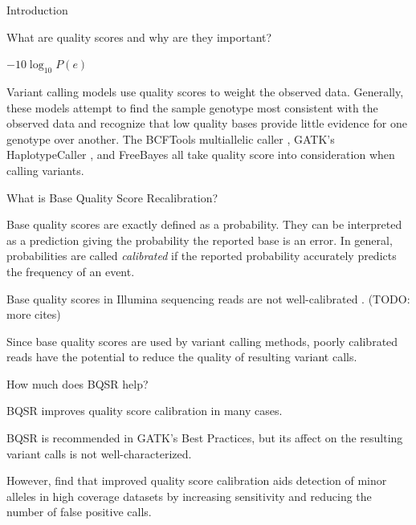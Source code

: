 \documentclass{article}
\begin{document}
\linenumbers
\begin{outline}
	\item Introduction
	\begin{outline}
		\item What are quality scores and why are they important? \parencite{ewing_base-calling_1998} \parencite{ewing_base-calling_1998-1}
		\begin{outline}
			\item $-10\log_{10}P(e)$ \parencite{ewing_base-calling_1998} \parencite{ewing_base-calling_1998-1}
			\item Variant calling models use quality scores to weight the observed data. Generally, these models attempt to find the sample genotype most consistent with the observed data and recognize that low quality bases provide little evidence for one genotype over another. The BCFTools multiallelic caller \parencite{li_sequence_2009}, GATK's HaplotypeCaller \parencite{poplin_scaling_2018}, and FreeBayes \parencite{garrison_haplotype-based_2012} all take quality score into consideration when calling variants.
		\end{outline}
		\item What is Base Quality Score Recalibration?
		\begin{outline}
			\item Base quality scores are exactly defined as a probability. They can be interpreted as a prediction giving the probability the reported base is an error. In general, probabilities are called \textit{calibrated} if the reported probability accurately predicts the frequency of an event.
			\item Base quality scores in Illumina sequencing reads are not well-calibrated \parencite{callahan_dada2:_2016}. (TODO: more cites)
			\item Since base quality scores are used by variant calling methods, poorly calibrated reads have the potential to reduce the quality of resulting variant calls.
		\end{outline}
		\item How much does BQSR help?
		\begin{outline}
			\item BQSR improves quality score calibration in many cases.
			\item BQSR is recommended in GATK's Best Practices, but its affect on the resulting variant calls is not well-characterized.
			\begin{outline}
				\item However, \cite{ni_improvement_2016} find that improved quality score calibration aids detection of minor alleles in high coverage datasets by increasing sensitivity and reducing the number of false positive calls.

\end{outline}
\end{outline}
\end{outline}
\end{outline}
\end{document}
